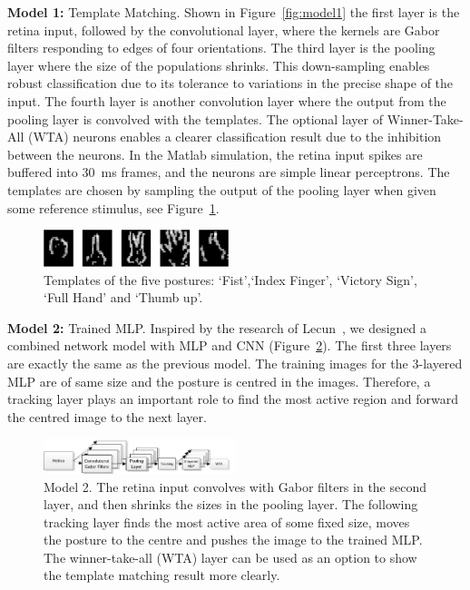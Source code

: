 \documentclass[journal]{journal}
\begin{document}
\textbf{Model 1: }
Template Matching. Shown in Figure~\ref{fig:model1} the first layer is the retina input, followed by the convolutional layer, where the kernels are Gabor filters responding to edges of four orientations.
The third layer is the pooling layer where the size of the populations shrinks. 
This down-sampling enables robust classification due to its tolerance to variations in the precise shape of the input. 
The fourth layer is another convolution layer where the output from the pooling layer is convolved with the templates.
The optional layer of Winner-Take-All (WTA) neurons enables a clearer classification result due to the inhibition between the neurons.
In the Matlab simulation, the retina input spikes are buffered into 30~ms frames, and the neurons are simple linear perceptrons.
The templates are chosen by sampling the output of the pooling layer when given some reference stimulus, see Figure~\ref{fig:template}.

\begin{figure}
\centering
	\includegraphics[width=0.48\textwidth]{pics/gesture.pdf}
	\caption{Templates of the five postures: `Fist',`Index Finger', `Victory Sign', `Full Hand' and `Thumb up'.}
	\label{fig:template}
\end{figure}

\textbf{Model 2: }
Trained MLP. 
Inspired by the research of Lecun~\cite{lecun1998gradient}, we designed a combined network model with MLP and CNN (Figure~\ref{fig:model2}). 
The first three layers are exactly the same as the previous model.
The training images for the 3-layered MLP are of same size and the posture is centred in the images.
Therefore, a tracking layer plays an important role to find the most active region and forward the centred image to the next layer.

\begin{figure}
\centering
	\includegraphics[width=0.5\textwidth]{pics/model2.pdf}
	\caption{Model 2. 
	The retina input convolves with Gabor filters in the second layer, and then shrinks the sizes in the pooling layer.
	The following tracking layer finds the most active area of some fixed size, moves the posture to the centre and pushes the image to the trained MLP.
	The winner-take-all (WTA) layer can be used as an option to show the template matching result more clearly.}
	\label{fig:model2}
\end{figure}
\end{document}
